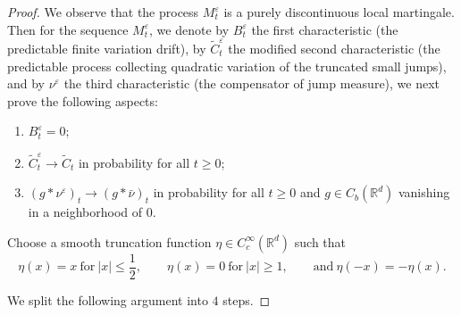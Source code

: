 \documentclass[11pt,reqno]{amsart}
\numberwithin{equation}{section}
\begin{document}
\begin{proof}
We observe that the process $M^\varepsilon_{t}$ is a purely discontinuous local martingale. Then for the sequence $M^\varepsilon_{t}$, we denote by $B^\varepsilon_{t}$ the first
characteristic (the predictable finite variation drift), by
$\widetilde C^\varepsilon_{t}$ the modified second characteristic (the
predictable process collecting quadratic variation of the truncated small jumps), and by $\nu^\varepsilon$ the third characteristic (the
compensator of jump measure), we next
prove the following aspects:
\begin{enumerate}
	\item $B_{t}^\varepsilon=0$;    %
	\item $\widetilde C^\varepsilon_t\to\widetilde C_t$ in probability for all $t\ge0$;
	\item $(g*\nu^\varepsilon)_t\to(g*\bar\nu)_t$ in probability for all $t\ge0$
	and $g\in C_b(\mathbb R^d)$ vanishing in a neighborhood of $0$.
\end{enumerate}



	Choose a smooth truncation function $\eta\in C_c^\infty(\mathbb R^d)$
	such that
	$$
	\eta(x)=x \ \text{for}\ |x|\le \frac12,
	\qquad	\eta(x)=0 \ \text{for}\ |x|\ge 1,	\qquad
	\text{and}\ \eta(-x)=-\eta(x).
	$$
	
	
	We split the following argument into $4$ steps.
	

\end{proof}
\end{document}
